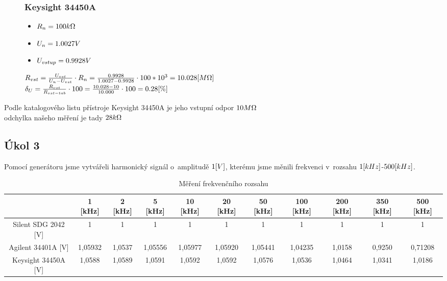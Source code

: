 \documentclass{article}
\begin{document}
\begin{figure}[H]
    \begin{minipage}[t]{0.3\textwidth}
        \subsubsection*{Keysight 34450A}
        \begin{itemize}
            \item \(R_n = 100\-k\Omega\) 
            \item \(U_n = 1.0027\-V\) 
            \item \(U_{vstup} = 0.9928\-V\) 
        \end{itemize}
    \end{minipage}
    \hfill
    \begin{minipage}[t]{0.7\textwidth}
        \vspace{10mm}
        \(
            R_{vst} = \frac{U_{vst}}{U_{n}-U_{vst}}\cdot R_n = \frac{0.9928}{1.0027-0.9928}\cdot 100*10^3 = 10.028\-[M\Omega]  
        \)
        \\
        \(
            \delta_U = \frac{R_{vst}}{R_{vst-tab}}\cdot100 = \frac{10.028 - 10}{10.000}\cdot100 = 0.28\-[\%]
        \)
    \end{minipage}
\end{figure}
Podle katalogového listu přístroje Keysight 34450A je jeho vstupní odpor \(10\-M\Omega \)\\odchylka našeho měření je tady \(28\-k\Omega\)

\subsection*{Úkol 3}
Pomocí generátoru jsme vytvářeli harmonický signál o~amplitudě \(1\-[V]\), kterému jsme měnili frekvenci v~rozsahu \(1\-[kHz]\)-\(500\-[kHz]\).\\ 
\begin{table}[H]
    \footnotesize
    \vspace{-6mm}
    \hspace{-8mm}
    \begin{tabular}{|c|c|c|c|c|c|c|c|c|c|c|}
    \hline
                        & 1 [kHz]  	& 2 [kHz]	& 5 [kHz]	& 10 [kHz]	& 20 [kHz]	& 50 [kHz]	& 100 [kHz]	& 200 [kHz]	& 350 [kHz]	& 500 [kHz] \\ \hline
    Silent SDG 2042 [V]	& 1	        & 1	        & 1      	& 1   	    & 1   	    & 1   	    & 1   	    & 1	        & 1   	    & 1         \\ \hline
    Agilent 34401A  [V] & 1,05932	& 1,0537	& 1,05556	& 1,05977	& 1,05920	& 1,05441	& 1,04235	& 1,0158	& 0,9250	& 0,71208   \\ \hline
    Keysight 34450A [V]	& 1,0588	& 1,0589	& 1,0591	& 1,0592	& 1,0592	& 1,0576	& 1,0536	& 1,0464	& 1,0341	& 1,0186    \\ \hline
    \end{tabular}
    \caption{\label{frekvencni_rozsah} Měření frekvenčního rozsahu}
    \normalsize
\end{table}
\end{document}
